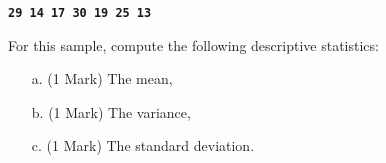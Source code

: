 \documentclass[a4paper,12pt]{article}
\begin{document}
\begin{center}
	\textbf{\texttt{29 14 17 30 19 25 13}}
\end{center}

\noindent For this sample, compute the following descriptive statistics:
\begin{itemize}
	\item[a.] (1 Mark) The mean,
	\item[b.] (1 Mark) The variance,
	\item[c.] (1 Mark) The standard deviation.
\end{itemize}
\end{document}
